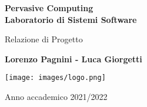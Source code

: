 \begin{titlepage}
    \begin{center}
        \vspace*{1cm}
        
        \Huge
        \textbf{Pervasive Computing \\ Laboratorio di Sistemi Software}
        
        \vspace{0.5cm}
        \LARGE
        Relazione di Progetto
        
        \vspace{1.0cm}
        \textbf{Lorenzo Pagnini - Luca Giorgetti}
        
        \vspace{1.5cm}
        \texttt{[image: images/logo.png]}
        
        \vspace{0.5cm}
        \LARGE
        Anno accademico 2021/2022
    
    \end{center}
\end{titlepage}